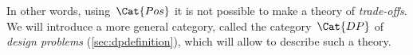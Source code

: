 In other words, using~$\Cat{Pos}$ it is not possible to make a theory of \emph{trade-offs}. We will introduce a more general category, called  the category~$\Cat{DP}$ of \emph{design problems} (\cref{sec:dpdefinition}), which will allow to describe such a theory.

    
